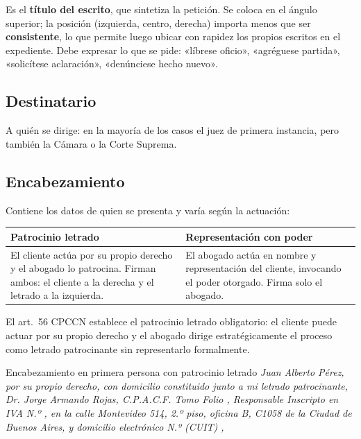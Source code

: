 \documentclass[12pt,oneside]{book}
\renewcommand{\arraystretch}{1.15}
\newcommand{\blanco}[1][1cm]{\underline{\hspace{#1}}}
\begin{document}
Es el \textbf{título del escrito}, que sintetiza la petición. Se coloca en el ángulo superior; la posición (izquierda, centro, derecha) importa menos que ser \textbf{consistente}, lo que permite luego ubicar con rapidez los propios escritos en el expediente. Debe expresar lo que se pide: «líbrese oficio», «agréguese partida», «solicítese aclaración», «denúnciese hecho nuevo».

\subsection{Destinatario}

A quién se dirige: en la mayoría de los casos el juez de primera instancia, pero también la Cámara o la Corte Suprema.

\subsection{Encabezamiento}

Contiene los datos de quien se presenta y varía según la actuación:

\begin{table}[H]
\centering
\renewcommand{\arraystretch}{1.25}
\begin{tabularx}{\textwidth}{>{\RaggedRight\arraybackslash}X>{\RaggedRight\arraybackslash}X}
\toprule
\textbf{Patrocinio letrado} & \textbf{Representación con poder} \\
\midrule
El cliente actúa por su propio derecho y el abogado lo patrocina. Firman ambos: el cliente a la derecha y el letrado a la izquierda. & El abogado actúa en nombre y representación del cliente, invocando el poder otorgado. Firma solo el abogado. \\
\bottomrule
\end{tabularx}
\end{table}

El art.~56 CPCCN establece el patrocinio letrado obligatorio: el cliente puede actuar por su propio derecho y el abogado dirige estratégicamente el proceso como letrado patrocinante sin representarlo formalmente.

\begin{ejemplo}{Encabezamiento en primera persona con patrocinio letrado}
\textit{Juan Alberto Pérez, por su propio derecho, con domicilio constituido junto a mi letrado patrocinante, Dr. Jorge Armando Rojas, C.P.A.C.F. Tomo \blanco[0.8cm] Folio \blanco[0.8cm], Responsable Inscripto en IVA N.º \blanco[1.5cm], en la calle Montevideo 514, 2.º piso, oficina B, C1058 de la Ciudad de Buenos Aires, y domicilio electrónico N.º (CUIT) \blanco[2.5cm],}
\end{ejemplo}
\end{document}
